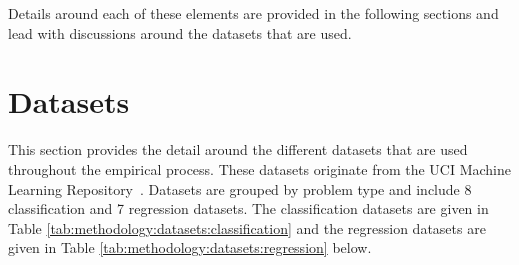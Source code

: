 Details around each of these elements are provided in the following sections and lead with discussions around the datasets that are used.

\section{Datasets}
\label{sec:methodology:datasets}

This section provides the detail around the different datasets that are used throughout the empirical process. These datasets originate from the UCI Machine Learning Repository~\cite{ref:uci:2022}. Datasets are grouped by problem type and include 8 classification and 7 regression datasets. The classification datasets are given in Table \ref{tab:methodology:datasets:classification} and the regression datasets are given in Table \ref{tab:methodology:datasets:regression} below.

